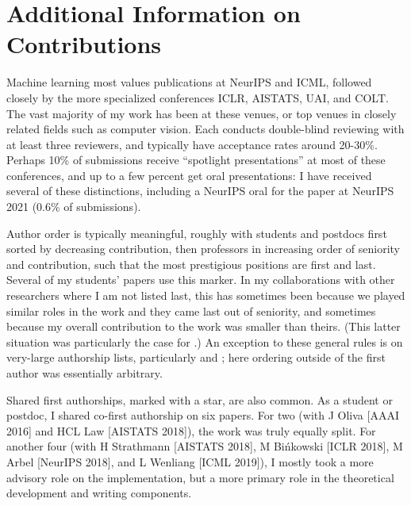 \documentclass[12pt]{article}
\newcommand{\bibeqcon}{{\footnotemark[1]}}
\begin{document}
\clearpage
\section{Additional Information on Contributions}
\renewcommand{\bibeqcon}{{\footnotemark[1]}}
\renewcommand{\thefootnote}{\fnsymbol{footnote}}  %
Machine learning most values publications at NeurIPS and ICML, followed closely by the more specialized conferences ICLR, AISTATS, UAI, and COLT. The vast majority of my work has been at these venues, or top venues in closely related fields such as computer vision. Each conducts double-blind reviewing with at least three reviewers, and typically have acceptance rates around 20-30\%.
Perhaps 10\% of submissions receive ``spotlight presentations'' at most of these conferences, and up to a few percent get oral presentations: I have received several of these distinctions, including a NeurIPS oral for the paper \cite{koehler:gaussian-interpolators} at NeurIPS 2021 (0.6\% of submissions).

Author order is typically meaningful,
roughly with students and postdocs first sorted by decreasing contribution,
then professors in increasing order of seniority and contribution,
such that the most prestigious positions are first and last.
Several of my students' papers use this marker.
In my collaborations with other researchers where I am not listed last,
this has sometimes been because we played similar roles in the work and they came last out of seniority,
and sometimes because my overall contribution to the work was smaller than theirs.
(This latter situation was particularly the case for
\cite{seo:contrastive-wsod}.)
An exception to these general rules is on very-large authorship lists,
particularly \cite{flamary:pot} and \cite{queerinai:qai};
here ordering outside of the first author was essentially arbitrary.

Shared first authorships, marked with a star, are also common.
As a student or postdoc, I shared co-first authorship on six papers.
For two (with J Oliva [AAAI 2016] and HCL Law [AISTATS 2018]),
the work was truly equally split.
For another four (with H Strathmann [AISTATS 2018], M Bińkowski [ICLR 2018], M Arbel [NeurIPS 2018], and L Wenliang [ICML 2019]),
I mostly took a more advisory role on the implementation, but a more primary role in the theoretical development and writing components.
\end{document}
